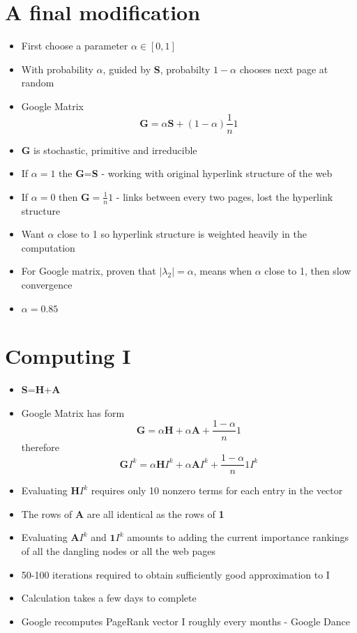 \documentclass[11pt]{report}
\begin{document}
\section{A final modification}
\begin{itemize}
\item First choose a parameter $\alpha\in[0,1]$ 
\item With probability $\alpha$, guided by \textbf{S}, probabilty $1-\alpha$ chooses next page at random
\item Google Matrix \begin{equation}
\textbf{G}=\alpha\textbf{S} +(1-\alpha)\frac{1}{n}1
\end{equation}
\item \textbf{G} is stochastic, primitive and irreducible
\item If $\alpha=1$ the \textbf{G}=\textbf{S} - working with original hyperlink structure of the web 
\item If $\alpha=0$ then $\textbf{G}=\frac{1}{n}1$ - links between every two pages, lost the hyperlink structure
\item Want $\alpha$ close to 1 so hyperlink structure is weighted heavily in the computation
\item For Google matrix, proven that $\vert\lambda_2\vert = \alpha$, means when $\alpha$ close to 1, then slow convergence
\item $\alpha= 0.85$
\end{itemize}
\section{Computing I}
\begin{itemize}
\item \textbf{S}=\textbf{H}+\textbf{A}
\item Google Matrix has form \begin{equation}
\textbf{G}=\alpha\textbf{H}+\alpha\textbf{A}+\frac{1-\alpha}{n}1
\end{equation} therefore \begin{equation}
\textbf{G}I^k=\alpha\textbf{H}I^k+\alpha\textbf{A}I^k+\frac{1-\alpha}{n}1I^k
\end{equation}
\item Evaluating $\textbf{H}I^k$ requires only 10 nonzero terms for each entry in the vector
\item The rows of \textbf{A} are all identical as the rows of \textbf{1}
\item Evaluating $\textbf{A}I^k$ and $\textbf{1}I^k$ amounts to adding the current importance rankings of all the dangling nodes or all the web pages
\item 50-100 iterations required to obtain sufficiently good approximation to I
\item Calculation takes a few days to complete
\item Google recomputes PageRank vector I roughly every months - Google Dance
\end{itemize}
\end{document}
